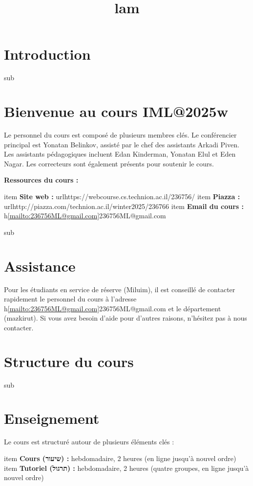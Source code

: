 \documentclass[12pt]{article}
\title{lam}
\author{}
\date{}
\begin{document}
\maketitle
\tableofcontents
\newpage

\section{Introduction}

sub\section{Bienvenue au cours IML@2025w}

Le personnel du cours est composé de plusieurs membres clés. Le conférencier principal est Yonatan Belinkov, assisté par le chef des assistants Arkadi Piven. Les assistants pédagogiques incluent Edan Kinderman, Yonatan Elul et Eden Nagar. Les correcteurs sont également présents pour soutenir le cours.

\textbf{Ressources du cours :}
\begin{itemize}
    item \textbf{Site web :} url{https://webcourse.cs.technion.ac.il/236756/}
    item \textbf{Piazza :} url{http://piazza.com/technion.ac.il/winter2025/236766}
    item \textbf{Email du cours :} h\ref{mailto:236756ML@gmail.com}{236756ML@gmail.com}
\end{itemize}

sub\section{Assistance}

Pour les étudiants en service de réserve (Miluim), il est conseillé de contacter rapidement le personnel du cours à l'adresse h\ref{mailto:236756ML@gmail.com}{236756ML@gmail.com} et le département (mazkirut). Si vous avez besoin d'aide pour d'autres raisons, n'hésitez pas à nous contacter.

\section{Structure du cours}

sub\section{Enseignement}

Le cours est structuré autour de plusieurs éléments clés :
\begin{itemize}
    item \textbf{Cours (שיעור) :} hebdomadaire, 2 heures (en ligne jusqu'à nouvel ordre)
    item \textbf{Tutoriel (תרגול) :} hebdomadaire, 2 heures (quatre groupes, en ligne jusqu'à nouvel ordre)
\end{itemize}
\end{document}
